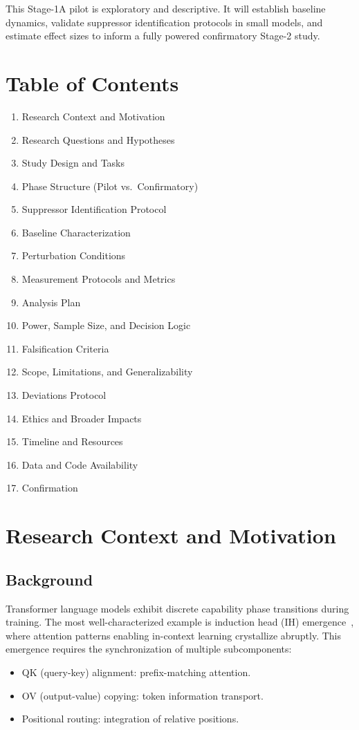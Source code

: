 \documentclass[11pt]{article}
\begin{document}
This Stage-1A pilot is exploratory and descriptive. It will establish baseline dynamics, validate suppressor identification protocols in small models, and estimate effect sizes to inform a fully powered confirmatory Stage-2 study.

\section*{Table of Contents}

\begin{enumerate}
  \item Research Context and Motivation
  \item Research Questions and Hypotheses
  \item Study Design and Tasks
  \item Phase Structure (Pilot vs.\ Confirmatory)
  \item Suppressor Identification Protocol
  \item Baseline Characterization
  \item Perturbation Conditions
  \item Measurement Protocols and Metrics
  \item Analysis Plan
  \item Power, Sample Size, and Decision Logic
  \item Falsification Criteria
  \item Scope, Limitations, and Generalizability
  \item Deviations Protocol
  \item Ethics and Broader Impacts
  \item Timeline and Resources
  \item Data and Code Availability
  \item Confirmation
\end{enumerate}

\section{Research Context and Motivation}

\subsection{Background}

Transformer language models exhibit discrete capability phase transitions during training. The most well-characterized example is induction head (IH) emergence~\cite{olsson2022induction}, where attention patterns enabling in-context learning crystallize abruptly. This emergence requires the synchronization of multiple subcomponents:
\begin{itemize}
  \item QK (query-key) alignment: prefix-matching attention.
  \item OV (output-value) copying: token information transport.
  \item Positional routing: integration of relative positions.
\end{itemize}
\end{document}

